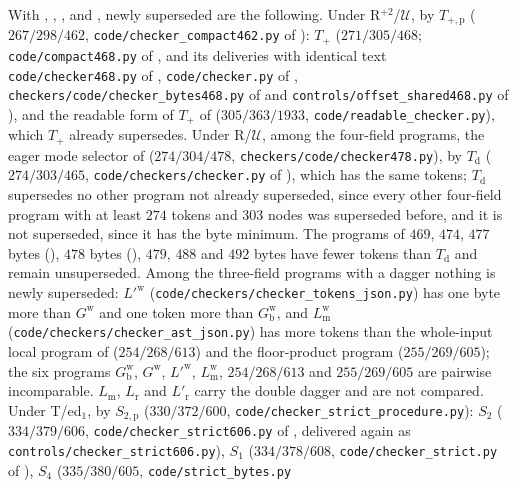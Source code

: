 With , , ,
 and , newly superseded are the
following. Under R$^{+2}$/$\mathcal U$, by $T_{+,\mathrm p}$ ($267/298/462$,
\texttt{code/checker\_compact462.py} of ): $T_{+}$
($271/305/468$; \texttt{code/compact468.py} of , and its
deliveries with identical text \texttt{code/checker468.py} of
, \texttt{code/checker.py} of ,
\texttt{checkers/code/checker\_bytes468.py} of  and
\texttt{controls/offset\_shared468.py} of ), and the
readable form of $T_{+}$ of  ($305/363/1933$,
\texttt{code/readable\_checker.py}), which $T_{+}$ already supersedes. Under
R/$\mathcal U$, among the four-field programs, the eager mode selector of
 ($274/304/478$, \texttt{checkers/code/checker478.py}),
by $T_{\mathrm d}$ ($274/303/465$, \texttt{code/checkers/checker.py} of
), which has the same tokens; $T_{\mathrm d}$ supersedes no
other program not already superseded, since every other four-field program with at
least $274$ tokens and $303$ nodes was superseded before, and it is not superseded,
since it has the byte minimum. The programs of $469$, $474$, $477$ bytes
(), $478$ bytes (), $479$, $488$
and $492$ bytes have fewer tokens than $T_{\mathrm d}$ and remain unsuperseded. Among the three-field programs with a dagger nothing
is newly superseded: $L'^{\mathrm w}$ (\texttt{code/checkers/checker\_tokens\_json.py})
has one byte more than $G^{\mathrm w}$ and one token more than
$G^{\mathrm w}_{\mathrm b}$, and $L^{\mathrm w}_{\mathrm m}$
(\texttt{code/checkers/checker\_ast\_json.py}) has more tokens than the whole-input
local program of  ($254/268/613$) and the
floor-product program ($255/269/605$); the six programs $G^{\mathrm w}_{\mathrm b}$,
$G^{\mathrm w}$, $L'^{\mathrm w}$, $L^{\mathrm w}_{\mathrm m}$, $254/268/613$ and
$255/269/605$ are pairwise incomparable. $L_{\mathrm m}$, $L_{\mathrm r}$ and
$L'_{\mathrm r}$ carry the double dagger and are not compared. Under T/ed$_1$, by
$S_{2,\mathrm p}$ ($330/372/600$, \texttt{code/checker\_strict\_procedure.py}):
$S_2$ ($334/379/606$, \texttt{code/checker\_strict606.py} of
, delivered again as \texttt{controls/checker\_strict606.py}),
$S_1$ ($334/378/608$, \texttt{code/checker\_strict.py} of
), $S_4$ ($335/380/605$, \texttt{code/strict\_bytes.py}
